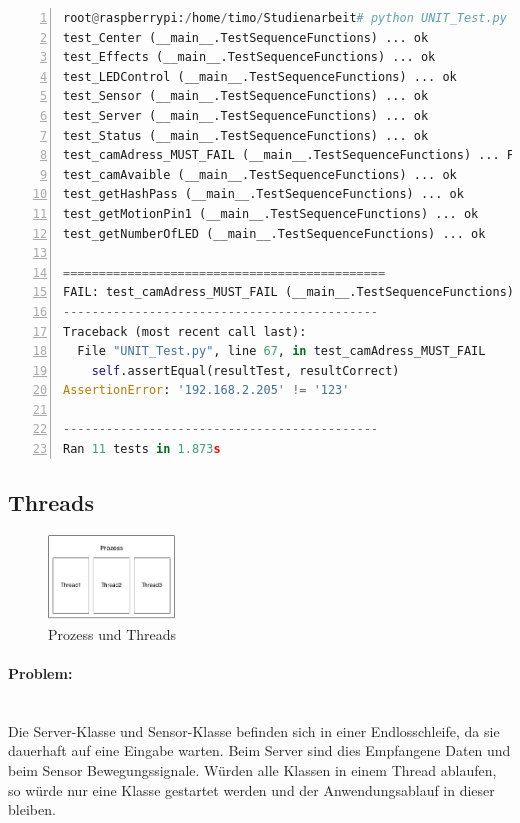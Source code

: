 \begin{lstlisting}[caption=Ausgabe der Klasse UNIT\_Test, language=python, frame=single, breaklines=true,columns=fullflexible, commentstyle=\color{gray}\upshape, captionpos=b, numbers = left]
root@raspberrypi:/home/timo/Studienarbeit# python UNIT_Test.py 
test_Center (__main__.TestSequenceFunctions) ... ok
test_Effects (__main__.TestSequenceFunctions) ... ok
test_LEDControl (__main__.TestSequenceFunctions) ... ok
test_Sensor (__main__.TestSequenceFunctions) ... ok
test_Server (__main__.TestSequenceFunctions) ... ok
test_Status (__main__.TestSequenceFunctions) ... ok
test_camAdress_MUST_FAIL (__main__.TestSequenceFunctions) ... FAIL
test_camAvaible (__main__.TestSequenceFunctions) ... ok
test_getHashPass (__main__.TestSequenceFunctions) ... ok
test_getMotionPin1 (__main__.TestSequenceFunctions) ... ok
test_getNumberOfLED (__main__.TestSequenceFunctions) ... ok

=============================================
FAIL: test_camAdress_MUST_FAIL (__main__.TestSequenceFunctions)
--------------------------------------------
Traceback (most recent call last):
  File "UNIT_Test.py", line 67, in test_camAdress_MUST_FAIL
    self.assertEqual(resultTest, resultCorrect)
AssertionError: '192.168.2.205' != '123'

--------------------------------------------
Ran 11 tests in 1.873s
\end{lstlisting}
\subsection{Threads}

\begin{figure}
	\vspace{-20pt}
	\begin{center}
		\includegraphics[width=0.3\textwidth]{./data/Threads.png}
	\end{center}
	\vspace{-20pt}
	\caption{Prozess und Threads}
	\vspace{-10pt}
\end{figure}

\paragraph{Problem:} \\ Die Server-Klasse und Sensor-Klasse befinden sich in einer Endlosschleife, da sie dauerhaft auf eine Eingabe warten. Beim Server sind dies Empfangene Daten und beim Sensor Bewegungssignale. Würden alle Klassen in einem Thread ablaufen, so würde nur eine Klasse gestartet werden und der Anwendungsablauf in dieser bleiben. 

